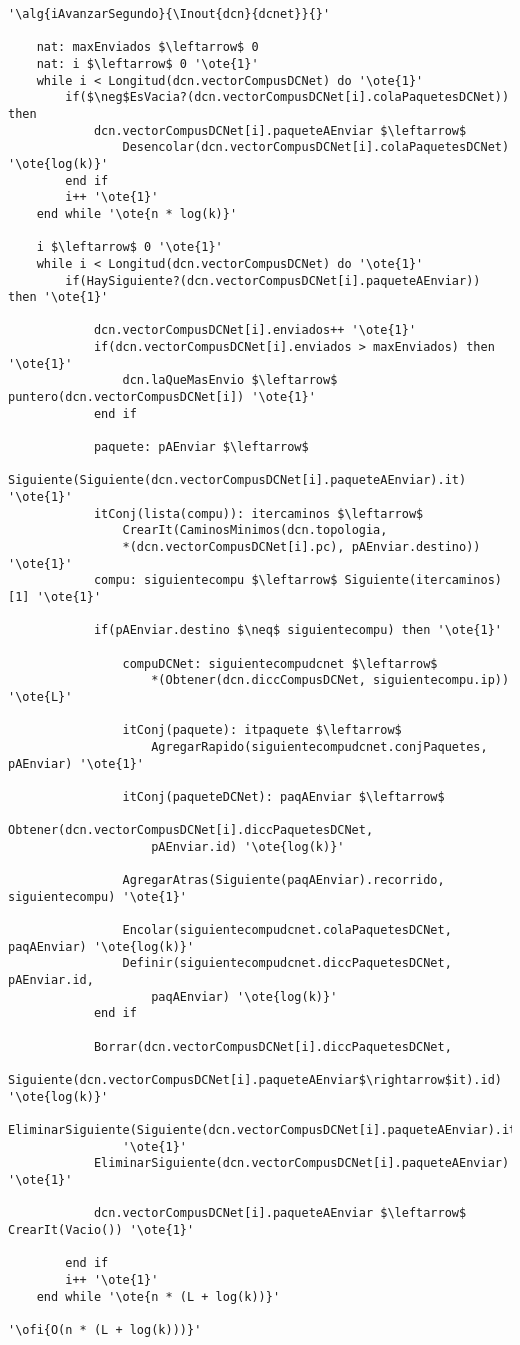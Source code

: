 \begin{lstlisting}[mathescape]
'\alg{iAvanzarSegundo}{\Inout{dcn}{dcnet}}{}'

	nat: maxEnviados $\leftarrow$ 0
	nat: i $\leftarrow$ 0 '\ote{1}'
	while i < Longitud(dcn.vectorCompusDCNet) do '\ote{1}'
		if($\neg$EsVacia?(dcn.vectorCompusDCNet[i].colaPaquetesDCNet)) then
			dcn.vectorCompusDCNet[i].paqueteAEnviar $\leftarrow$
				Desencolar(dcn.vectorCompusDCNet[i].colaPaquetesDCNet) '\ote{log(k)}'
		end if
		i++ '\ote{1}'
	end while '\ote{n * log(k)}'

	i $\leftarrow$ 0 '\ote{1}'
	while i < Longitud(dcn.vectorCompusDCNet) do '\ote{1}'
		if(HaySiguiente?(dcn.vectorCompusDCNet[i].paqueteAEnviar)) then '\ote{1}'

			dcn.vectorCompusDCNet[i].enviados++ '\ote{1}'
			if(dcn.vectorCompusDCNet[i].enviados > maxEnviados) then '\ote{1}'
				dcn.laQueMasEnvio $\leftarrow$ puntero(dcn.vectorCompusDCNet[i]) '\ote{1}'
			end if

			paquete: pAEnviar $\leftarrow$
				Siguiente(Siguiente(dcn.vectorCompusDCNet[i].paqueteAEnviar).it) '\ote{1}'
			itConj(lista(compu)): itercaminos $\leftarrow$
				CrearIt(CaminosMinimos(dcn.topologia,
				*(dcn.vectorCompusDCNet[i].pc), pAEnviar.destino)) '\ote{1}'
			compu: siguientecompu $\leftarrow$ Siguiente(itercaminos)[1] '\ote{1}'

			if(pAEnviar.destino $\neq$ siguientecompu) then '\ote{1}'

				compuDCNet: siguientecompudcnet $\leftarrow$
					*(Obtener(dcn.diccCompusDCNet, siguientecompu.ip)) '\ote{L}'

				itConj(paquete): itpaquete $\leftarrow$
					AgregarRapido(siguientecompudcnet.conjPaquetes, pAEnviar) '\ote{1}'

				itConj(paqueteDCNet): paqAEnviar $\leftarrow$
					Obtener(dcn.vectorCompusDCNet[i].diccPaquetesDCNet,
					pAEnviar.id) '\ote{log(k)}'

				AgregarAtras(Siguiente(paqAEnviar).recorrido, siguientecompu) '\ote{1}'

				Encolar(siguientecompudcnet.colaPaquetesDCNet, paqAEnviar) '\ote{log(k)}'
				Definir(siguientecompudcnet.diccPaquetesDCNet, pAEnviar.id,
					paqAEnviar) '\ote{log(k)}'
			end if

			Borrar(dcn.vectorCompusDCNet[i].diccPaquetesDCNet,
				Siguiente(dcn.vectorCompusDCNet[i].paqueteAEnviar$\rightarrow$it).id) '\ote{log(k)}'
			EliminarSiguiente(Siguiente(dcn.vectorCompusDCNet[i].paqueteAEnviar).it)
				'\ote{1}'
			EliminarSiguiente(dcn.vectorCompusDCNet[i].paqueteAEnviar) '\ote{1}'

			dcn.vectorCompusDCNet[i].paqueteAEnviar $\leftarrow$ CrearIt(Vacio()) '\ote{1}'

		end if
		i++ '\ote{1}'
	end while '\ote{n * (L + log(k))}'

'\ofi{O(n * (L + log(k)))}'
\end{lstlisting}

